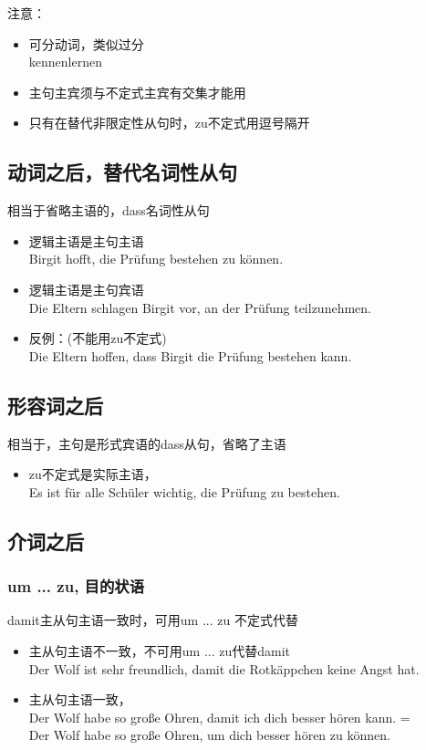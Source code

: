 注意：
\begin{itemize}
    \item 可分动词，类似过分 \\
          kennenlernen 
    \item 主句主宾须与不定式主宾有交集才能用
    \item 只有在替代非限定性从句时，zu不定式用逗号隔开
\end{itemize}

\subsection{动词之后，替代名词性从句}
相当于省略主语的，dass名词性从句
\begin{itemize}
    \item 逻辑主语是主句主语 \\
          Birgit hofft, die Prüfung bestehen zu können.
    \item 逻辑主语是主句宾语 \\
          Die Eltern schlagen Birgit vor, an der Prüfung teilzunehmen.
    \item 反例：(不能用zu不定式) \\
          Die Eltern hoffen, dass Birgit die Prüfung bestehen kann.
\end{itemize}

\subsection{形容词之后}
相当于，主句是形式宾语的dass从句，省略了主语
\begin{itemize}
    \item zu不定式是实际主语， \\
          Es ist für alle Schüler wichtig, die Prüfung zu bestehen.
\end{itemize}

\subsection{介词之后}
\subsubsection{um ... zu, 目的状语}
\label{subsec:zu:final}
damit主从句主语一致时，可用um ... zu 不定式代替 \\
\begin{itemize}
    \item 主从句主语不一致，不可用um ... zu代替damit \\
          Der Wolf ist sehr freundlich, damit die Rotkäppchen keine Angst hat.
    \item  主从句主语一致，\\
          Der Wolf habe so große Ohren, damit ich dich besser hören kann. = \\
          Der Wolf habe so große Ohren, um dich besser hören zu können.
\end{itemize}

